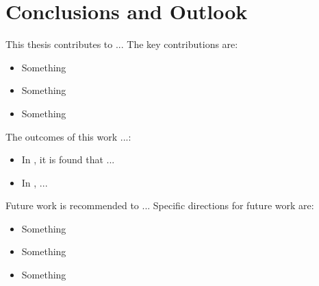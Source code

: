 \chapter{Conclusions and Outlook} \label{chap:conclusions}

This thesis contributes to ... The key contributions are:
\begin{itemize}[topsep=0pt,beginpenalty=10000,first=]
	\item Something
	\item Something
	\item Something
\end{itemize}

The outcomes of this work ...:
\begin{itemize}[topsep=0pt,beginpenalty=10000,first=]
	\item In , it is found that ...
	\item In , ...
\end{itemize}

Future work is recommended to ... Specific directions for future work are:
\begin{itemize}[topsep=0pt,beginpenalty=10000,first=]
	\item Something
	\item Something
	\item Something
\end{itemize}

